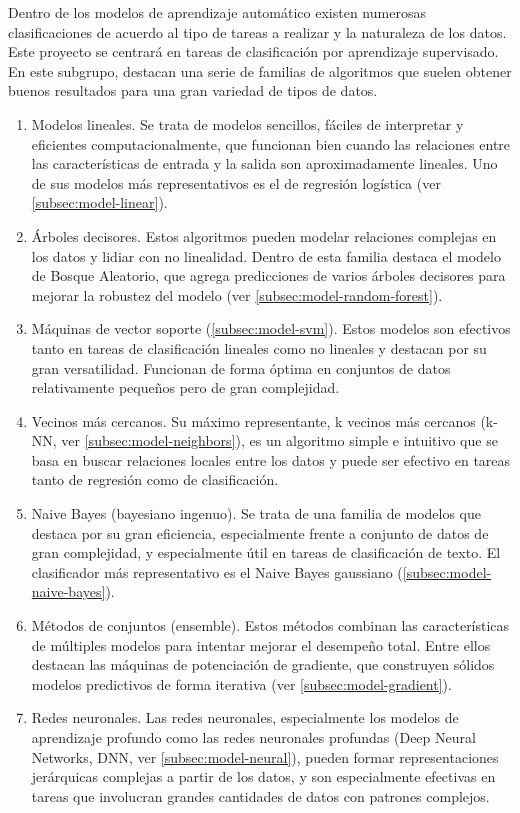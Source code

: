 Dentro de los modelos de aprendizaje automático existen numerosas clasificaciones de acuerdo al tipo de tareas a realizar y la naturaleza de los datos. Este proyecto se centrará en tareas de clasificación por aprendizaje supervisado. En este subgrupo, destacan una serie de familias de algoritmos que suelen obtener buenos resultados para una gran variedad de tipos de datos.
\begin{enumerate}
    \item Modelos lineales. Se trata de modelos sencillos, fáciles de interpretar y eficientes computacionalmente, que funcionan bien cuando las relaciones entre las características de entrada y la salida son aproximadamente lineales. Uno de sus modelos más representativos es el de regresión logística (ver \ref{subsec:model-linear}).
    \item Árboles decisores. Estos algoritmos pueden modelar relaciones complejas en los datos y lidiar con no linealidad. Dentro de esta familia destaca el modelo de Bosque Aleatorio, que agrega predicciones de varios árboles decisores para mejorar la robustez del modelo (ver \ref{subsec:model-random-forest}).
    \item Máquinas de vector soporte (\ref{subsec:model-svm}). Estos modelos son efectivos tanto en tareas de clasificación lineales como no lineales y destacan por su gran versatilidad. Funcionan de forma óptima en conjuntos de datos relativamente pequeños pero de gran complejidad.
    \item Vecinos más cercanos. Su máximo representante, k vecinos más cercanos (k-NN, ver \ref{subsec:model-neighbors}), es un algoritmo simple e intuitivo que se basa en buscar relaciones locales entre los datos y puede ser efectivo en tareas tanto de regresión como de clasificación.
    \item Naive Bayes (bayesiano ingenuo). Se trata de una familia de modelos que destaca por su gran eficiencia, especialmente frente a conjunto de datos de gran complejidad, y especialmente útil en tareas de clasificación de texto. El clasificador más representativo es el Naive Bayes gaussiano (\ref{subsec:model-naive-bayes}).
    \item Métodos de conjuntos (ensemble). Estos métodos combinan las características de múltiples modelos para intentar mejorar el desempeño total. Entre ellos destacan las máquinas de potenciación de gradiente, que construyen sólidos modelos predictivos de forma iterativa (ver \ref{subsec:model-gradient}).
    \item Redes neuronales. Las redes neuronales, especialmente los modelos de aprendizaje profundo como las redes neuronales profundas (Deep Neural Networks, DNN, ver \ref{subsec:model-neural}), pueden formar representaciones jerárquicas complejas a partir de los datos, y son especialmente efectivas en tareas que involucran grandes cantidades de datos con patrones complejos.
\end{enumerate}

